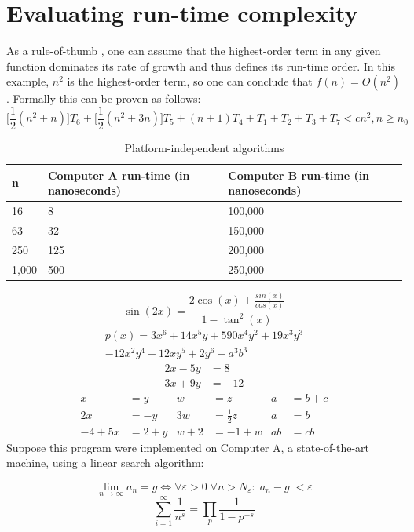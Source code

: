 \documentclass[openany,a4paper,12pt]{book}
\begin{document}
\section{Evaluating run-time complexity}
As a rule-of-thumb \cite{greenwade93:1}, one can assume that the highest-order term in any given function dominates its rate of growth and thus defines its run-time order. In this example, $n^2$ is the highest-order term, so one can conclude that $f(n) = O(n^2)$. Formally this can be proven as follows:
\begin{equation}
\bigg[\frac{1}{2}(n^2+n)\bigg]T_{6}+\bigg[\frac{1}{2}(n^2+3n)\bigg]T_{5}+(n+1)T_{4}+T_{1}+T_{2}+T_{3}+T_{7}<cn^2, n \geq n_{0}
\end{equation}
\begin{table}[H]
\caption{Platform-independent algorithms} 
\begin{center} 
\begin{tabular}{|l|p{3cm}|p{3cm}|}
\hline \textbf{n} & \textbf{Computer A run-time (in nanoseconds)} & \textbf{Computer B run-time (in nanoseconds)} \\ \hline
16 & 8 & 100,000 \\
63 & 32 & 150,000 \\
250 & 125 & 200,000 \\
1,000 & 500 & 250,000 \\ \hline
\end{tabular}
\end{center}
\end{table}
$$\sin (2x)=\frac{2\cos (x)+\frac{sin (x)}{cos (x)}}{1-\tan^2(x)}$$
\begin{multline*}
p(x) = 3x^6 + 14x^5y + 590x^4y^2 + 19x^3y^3\\ 
- 12x^2y^4 - 12xy^5 + 2y^6 - a^3b^3
\end{multline*}
\begin{align*} 
2x - 5y &=  8 \\ 
3x + 9y &=  -12
\end{align*}
\begin{align*}
x&=y           &  w &=z              &  a&=b+c\\
2x&=-y         &  3w&=\frac{1}{2}z   &  a&=b\\
-4 + 5x&=2+y   &  w+2&=-1+w          &  ab&=cb
\end{align*}
Suppose this program were implemented on Computer A, a state-of-the-art machine, using a linear search algorithm:

\begin{equation}
\lim_{n \to \infty} a_{n} = g \Leftrightarrow
\forall {\varepsilon > 0} \;
\forall {n > N_{\varepsilon}} \colon
\left| {a_{n} - g} \right| < \varepsilon
\end{equation}
\[ \sum_{i=1}^{\infty} \frac{1}{n^s} 
= \prod_p \frac{1}{1 - p^{-s}} \]
\end{document}
